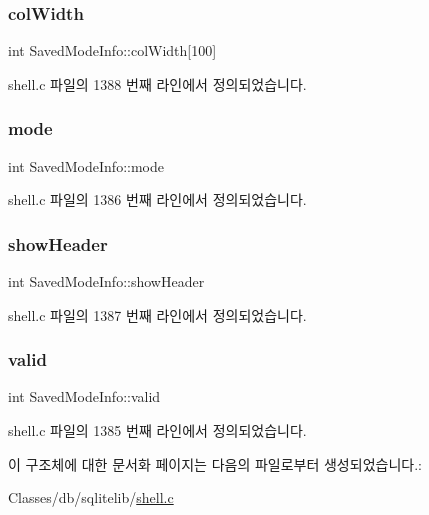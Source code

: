 \subsubsection{\texorpdfstring{col\+Width}{colWidth}}
{\footnotesize\ttfamily int Saved\+Mode\+Info\+::col\+Width\mbox{[}100\mbox{]}}



shell.\+c 파일의 1388 번째 라인에서 정의되었습니다.

\mbox{\label{struct_saved_mode_info_ab6d30b28565d51ca017904f70b5edac6}} 
\subsubsection{\texorpdfstring{mode}{mode}}
{\footnotesize\ttfamily int Saved\+Mode\+Info\+::mode}



shell.\+c 파일의 1386 번째 라인에서 정의되었습니다.

\mbox{\label{struct_saved_mode_info_a73fa5b451f94fa75fb5e27887831b8f4}} 
\subsubsection{\texorpdfstring{show\+Header}{showHeader}}
{\footnotesize\ttfamily int Saved\+Mode\+Info\+::show\+Header}



shell.\+c 파일의 1387 번째 라인에서 정의되었습니다.

\mbox{\label{struct_saved_mode_info_a43e863fb285c2aad913087572ebd5e27}} 
\subsubsection{\texorpdfstring{valid}{valid}}
{\footnotesize\ttfamily int Saved\+Mode\+Info\+::valid}



shell.\+c 파일의 1385 번째 라인에서 정의되었습니다.



이 구조체에 대한 문서화 페이지는 다음의 파일로부터 생성되었습니다.\+:\begin{DoxyCompactItemize}
\item 
Classes/db/sqlitelib/\hyperlink{shell_8c}{shell.\+c}\end{DoxyCompactItemize}
